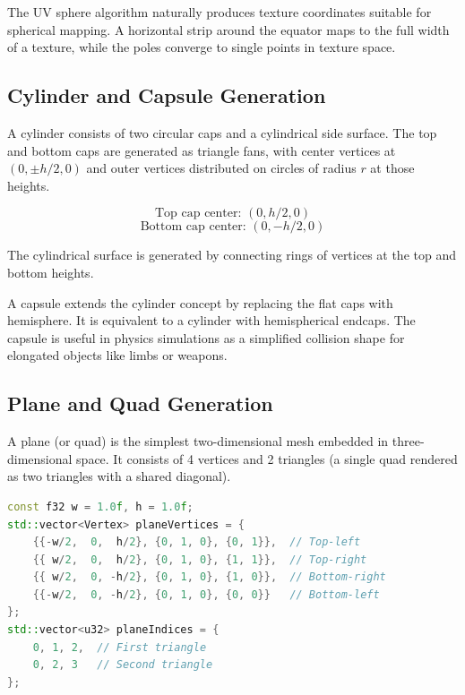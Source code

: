 The UV sphere algorithm naturally produces texture coordinates suitable for spherical mapping. A horizontal strip around the equator maps to the full width of a texture, while the poles converge to single points in texture space.

\subsection{Cylinder and Capsule Generation}

A cylinder consists of two circular caps and a cylindrical side surface. The top and bottom caps are generated as triangle fans, with center vertices at $(0, \pm h/2, 0)$ and outer vertices distributed on circles of radius $r$ at those heights.

\begin{equation}
    \text{Top cap center: } (0, h/2, 0)
\end{equation}
\begin{equation}
    \text{Bottom cap center: } (0, -h/2, 0)
\end{equation}

The cylindrical surface is generated by connecting rings of vertices at the top and bottom heights.

A capsule extends the cylinder concept by replacing the flat caps with hemisphere. It is equivalent to a cylinder with hemispherical endcaps. The capsule is useful in physics simulations as a simplified collision shape for elongated objects like limbs or weapons.

\subsection{Plane and Quad Generation}

A plane (or quad) is the simplest two-dimensional mesh embedded in three-dimensional space. It consists of 4 vertices and 2 triangles (a single quad rendered as two triangles with a shared diagonal).

\begin{lstlisting}[language=C++, caption=Quad Mesh Generation]
const f32 w = 1.0f, h = 1.0f;
std::vector<Vertex> planeVertices = {
    {{-w/2,  0,  h/2}, {0, 1, 0}, {0, 1}},  // Top-left
    {{ w/2,  0,  h/2}, {0, 1, 0}, {1, 1}},  // Top-right
    {{ w/2,  0, -h/2}, {0, 1, 0}, {1, 0}},  // Bottom-right
    {{-w/2,  0, -h/2}, {0, 1, 0}, {0, 0}}   // Bottom-left
};
std::vector<u32> planeIndices = {
    0, 1, 2,  // First triangle
    0, 2, 3   // Second triangle
};
\end{lstlisting}

